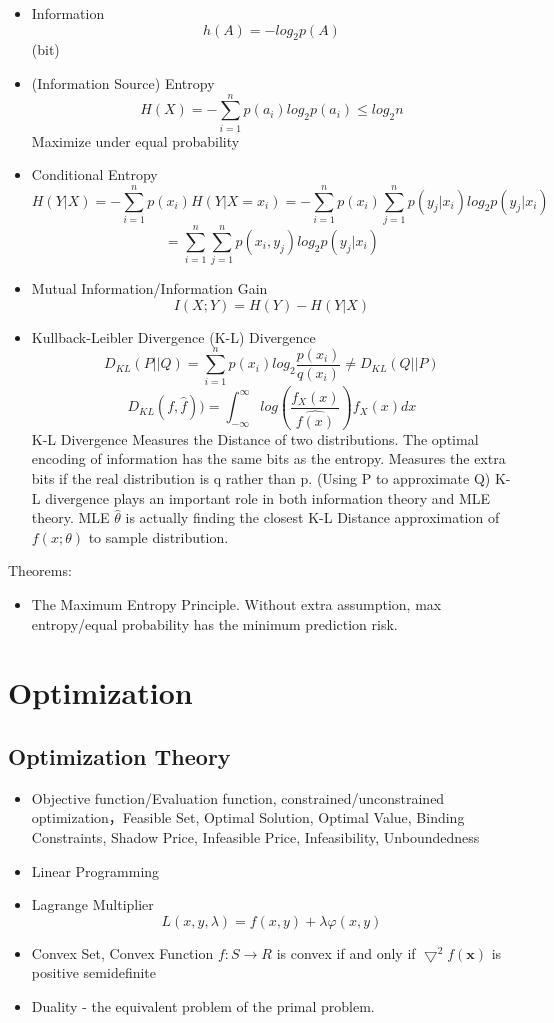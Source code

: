 \documentclass[11pt, openany]{book}              %
\begin{document}
\begin{itemize}
    \item Information $$h(A) = -log_2 p(A)$$ (bit)
    \item (Information Source) Entropy $$ H(X) = -\sum_{i=1}^n p(a_i)log_2p(a_i) \leq log_2 n$$ Maximize under equal probability
    \item Conditional Entropy $$H(Y|X)  = -\sum_{i=1}^n p(x_i)H(Y|X=x_i)= -\sum_{i=1}^n p(x_i)\sum_{j=1}^n p(y_j|x_i) log_2p(y_j|x_i) $$ $$ = \sum_{i=1}^n \sum_{j=1}^n p(x_i,y_j) log_2p(y_j|x_i) $$
    \item Mutual Information/Information Gain $$I(X;Y) = H(Y) - H(Y|X)$$
    \item Kullback-Leibler Divergence (K-L) Divergence 
      $$D_{KL}(P||Q) = \sum_{i=1}^n p(x_i) log_2\frac{p(x_i)}{q(x_i)} \neq D_{KL}(Q||P)$$
      $$D_{KL}(f,\hat{f})) = \int_{-\infty}^{\infty} log(\frac{f_X(x)}{\hat{f(x)}})f_X(x)dx $$
     K-L Divergence Measures the Distance of two distributions. The optimal encoding of information has the same bits as the entropy. Measures the extra bits if the real distribution is q rather than p. (Using P to approximate Q) K-L divergence plays an important role in both information theory and MLE theory. MLE $\hat{\theta}$ is actually finding the closest K-L Distance approximation of $f(x;\theta)$ to sample distribution.
\end{itemize}
Theorems:

\begin{itemize}
    \item The Maximum Entropy Principle. Without extra assumption, max entropy/equal probability has the minimum prediction risk. 
\end{itemize}
 
\section{Optimization}

\subsection{Optimization Theory}

\begin{itemize}
    \item Objective function/Evaluation function, constrained/unconstrained optimization，Feasible Set, Optimal Solution, Optimal Value, Binding Constraints, Shadow Price, Infeasible Price, Infeasibility, Unboundedness    
    \item Linear Programming
    \item Lagrange Multiplier $$L(x,y,\lambda) = f(x,y) + \lambda \varphi(x,y) $$
    \item Convex Set, Convex Function $f:S\to R$ is convex if and only if $\bigtriangledown^2 f(\mathbf{x})$ is positive semidefinite 
    \item Duality - the equivalent problem of the primal problem.
\end{itemize}
\end{document}
